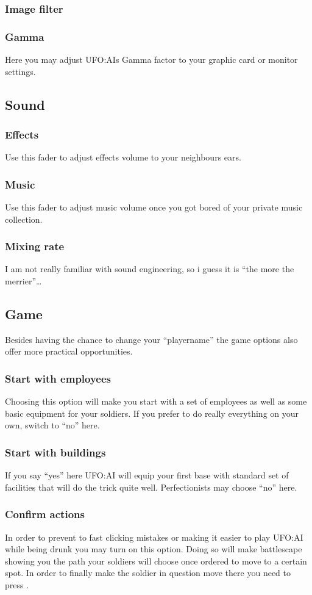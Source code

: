 \subsubsection*{Image filter}
\subsubsection*{Gamma}
Here you may adjust UFO:AIs Gamma factor to your graphic card or monitor settings.

\subsection{Sound}
\subsubsection*{Effects}
Use this fader to adjust effects volume to your neighbours ears.
\subsubsection*{Music}
Use this fader to adjust music volume once you got bored of your private music collection.
\subsubsection*{Mixing rate}
I am not really familiar with sound engineering, so i guess it is ``the more the merrier''\ldots

\subsection{Game}
Besides having the chance to change your ``playername'' the game options also offer more practical opportunities.
\subsubsection*{Start with employees}
Choosing this option will make you start with a set of employees as well as some basic equipment for your soldiers. If you prefer to do really everything on your own, switch to ``no'' here.
\subsubsection*{Start with buildings}
If you say ``yes'' here UFO:AI will equip your first base with standard set of facilities that will do the trick quite well. Perfectionists may choose ``no'' here.
\subsubsection*{Confirm actions}
In order to prevent to fast clicking mistakes or making it easier to play UFO:AI while being drunk you may turn on this option. Doing so will make battlescape showing you the path your soldiers will choose once ordered to move to a certain spot. In order to finally make the soldier in question move there you need to press .
